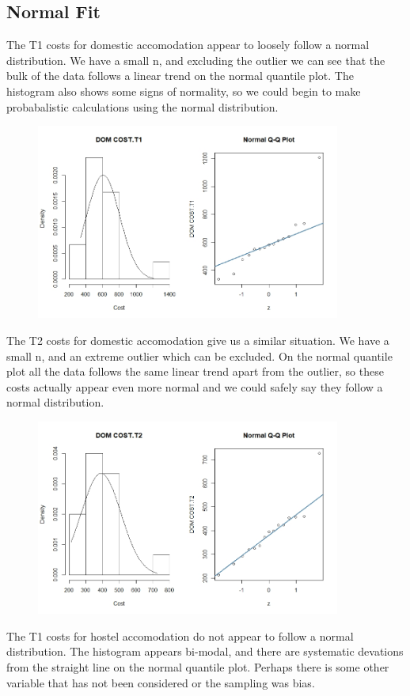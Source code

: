 \documentclass[]{article}
\begin{document}

\newpage
\subsection{Normal Fit}
The T1 costs for domestic accomodation appear to loosely follow a normal distribution. We have a small n, and excluding the outlier we can see that the bulk of the data follows a linear trend on the normal quantile plot. The histogram also shows some signs of normality, so we could begin to make probabalistic calculations using the normal distribution.
\begin{figure}[H]
\centering
\includegraphics[width=10cm]{RStudio/jpeg/Norm_DOM_T1.jpeg}
\end{figure}
The T2 costs for domestic accomodation give us a similar situation. We have a small n, and an extreme outlier which can be excluded. On the normal quantile plot all the data follows the same linear trend apart from the outlier, so these costs actually appear even more normal and we could safely say they follow a normal distribution.
\begin{figure}[H]
\centering
\includegraphics[width=10cm]{RStudio/jpeg/Norm_DOM_T2.jpeg}
\end{figure}
\newpage
The T1 costs for hostel accomodation do not appear to follow a normal distribution. The histogram appears bi-modal, and there are systematic devations from the straight line on the normal quantile plot. Perhaps there is some other variable that has not been considered or the sampling was bias.
\end{document}
